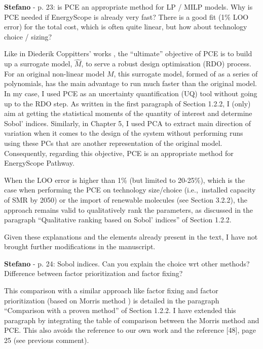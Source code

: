 \documentclass[12pt,a4paper]{article}
\def\ie{i.e.,\ }
\begin{document}
\begin{mdframed}[style=comment] %
{\color{orange} \textbf{Stefano}} - p. 23: is PCE an appropriate method for LP / MILP models. Why is PCE needed if EnergyScope is already very fast? There is a good fit (1\% LOO error) for the total cost, which is often quite linear, but how about technology choice / sizing?
\end{mdframed}

\noindent Like in Diederik Coppitters' works \cite{coppitters2021robust,coppittersthesis}, the ``ultimate'' objective of PCE is to build up a surrogate model, $\hat{M}$, to serve a robust design optimisation (RDO) process. For an original non-linear model $M$, this surrogate model, formed of as a series of polynomials,  has the main advantage to run much faster than the original model. In my case, I used PCE as an uncertainty quantification (UQ) tool without going up to the RDO step. As written {\color{blue}in the first paragraph of Section 1.2.2}, I (only) aim at getting the statistical moments of the quantity of interest and determine Sobol' indices. Similarly, in Chapter 5, I used PCA to extract main direction of variation when it comes to the design of the system without performing runs using these PCs that are another representation of the original model. Consequently, regarding this objective, PCE is an appropriate method for EnergyScope Pathway. 

\noindent When the LOO error is higher than 1\% (but limited to 20-25\%), which is the case when performing the PCE on technology size/choice (\ie installed capacity of SMR by 2050) or the import of renewable molecules (see Section 3.2.2), the approach remains valid to qualitatively rank the parameters, {\color{blue}as discussed in the paragraph ``Qualitative ranking based on Sobol' indices'' of Section 1.2.2}.

\noindent Given these explanations and the elements already present in the text, I have not brought further modifications in the manuscript.

\begin{mdframed}[style=comment] %
{\color{orange} \textbf{Stefano}} - p. 24: Sobol indices. Can you explain the choice wrt other methods? Difference between factor prioritization and factor fixing?
\end{mdframed}

\noindent This comparison with a similar approach like factor fixing and factor prioritization (based on Morris method \cite{morris_factorial_1991}) is detailed {\color{blue}in the paragraph ``Comparison with a proven method'' of Section 1.2.2}. I have extended this paragraph by integrating the table of comparison between the Morris method and PCE.  This also avoids the reference to our own work and the reference [48], page 25 (see previous comment).
\end{document}
